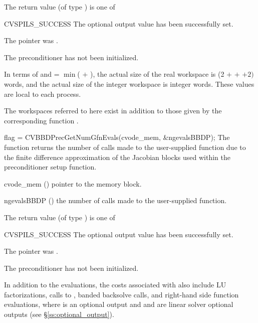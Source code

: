 {
  The return value  (of type ) is one of
  \begin{args}
  \item[CVSPILS\_SUCCESS] 
    The optional output value has been successfully set.
  \item[\id{CVSPILS\_MEM\_NULL}] 
    The  pointer was .
  \item[\Id{CVSPILS\_PMEM\_NULL}]
    The {\cvbbdpre} preconditioner has not been initialized.
  \end{args}
}
{
  In terms of  and
   = $\min$( $+$ ),
  the actual size of the real workspace is
  (2  $+$  $+$  $+2) \, $
   words, and the actual size of the integer workspace is
   integer words.  These values are local to each process.

  The workspaces referred to here exist in addition to those given by the
  corresponding function .
}
{
  flag = CVBBDPrecGetNumGfnEvals(cvode\_mem, \&ngevalsBBDP);
}
{
  The function  returns the
  number of calls made to the user-supplied  function due to the 
  finite difference approximation of the Jacobian blocks used within
  the preconditioner setup function.
}
{
  \begin{args}[ngevalsBBDP]
  \item[cvode\_mem] ()
    pointer to the {\cvode} memory block.
  \item[ngevalsBBDP] ()
    the number of calls made to the user-supplied  function.
  \end{args}
}
{
  The return value  (of type ) is one of
  \begin{args}
  \item[CVSPILS\_SUCCESS] 
    The optional output value has been successfully set.
  \item[\id{CVSPILS\_MEM\_NULL}] 
    The  pointer was .
  \item[\Id{CVSPILS\_PMEM\_NULL}]
    The {\cvbbdpre} preconditioner has not been initialized.
  \end{args}
}
{}

In addition to the   evaluations,
the costs associated with {\cvbbdpre} also include  LU
factorizations,  calls to ,  banded
backsolve calls, and  right-hand side function evaluations,
where  is an optional {\cvode} output and  and 
 are linear solver optional outputs (see \S\ref{ss:optional_output}).
